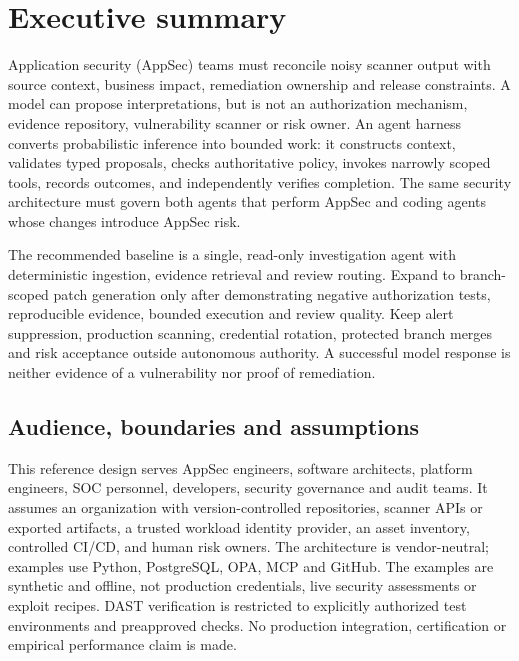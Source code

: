 \documentclass[11pt,letterpaper]{article}
\begin{document}
\makedoctocpage
\section{Executive summary}
Application security (AppSec) teams must reconcile noisy scanner output with source context, business impact, remediation ownership and release constraints. A model can propose interpretations, but is not an authorization mechanism, evidence repository, vulnerability scanner or risk owner. An agent harness converts probabilistic inference into bounded work: it constructs context, validates typed proposals, checks authoritative policy, invokes narrowly scoped tools, records outcomes, and independently verifies completion. The same security architecture must govern both agents that perform AppSec and coding agents whose changes introduce AppSec risk.

The recommended baseline is a single, read-only investigation agent with deterministic ingestion, evidence retrieval and review routing. Expand to branch-scoped patch generation only after demonstrating negative authorization tests, reproducible evidence, bounded execution and review quality. Keep alert suppression, production scanning, credential rotation, protected branch merges and risk acceptance outside autonomous authority. A successful model response is neither evidence of a vulnerability nor proof of remediation.

\subsection{Audience, boundaries and assumptions}
This reference design serves AppSec engineers, software architects, platform engineers, SOC personnel, developers, security governance and audit teams. It assumes an organization with version-controlled repositories, scanner APIs or exported artifacts, a trusted workload identity provider, an asset inventory, controlled CI/CD, and human risk owners. The architecture is vendor-neutral; examples use Python, PostgreSQL, OPA, MCP and GitHub. The examples are synthetic and offline, not production credentials, live security assessments or exploit recipes. DAST verification is restricted to explicitly authorized test environments and preapproved checks. No production integration, certification or empirical performance claim is made.
\end{document}
